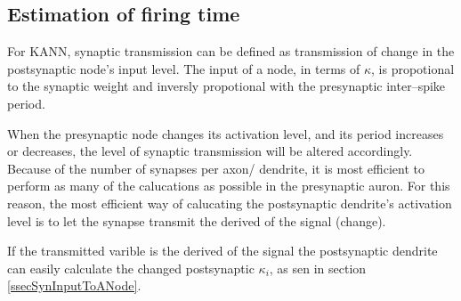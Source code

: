 




	\subsection{Estimation of firing time}
	For KANN, synaptic transmission can be defined as transmission of change in the postsynaptic node's input level.
	The input of a node, in terms of $\kappa$, is propotional to the synaptic weight and inversly propotional with the presynaptic inter--spike period.

	When the presynaptic node changes its activation level, and its period increases or decreases, the level of synaptic transmission will be altered accordingly. 
	Because of the number of synapses per axon/ dendrite, it is most efficient to perform as many of the calucations as possible in the presynaptic auron.
	For this reason, the most efficient way of calucating the postsynaptic dendrite's activation level is to let the synapse transmit the derived of the signal (change).

	If the transmitted varible is the derived of the signal the postsynaptic dendrite can easily calculate the changed postsynaptic $\kappa_i$, as sen in section \ref{ssecSynInputToANode}.
	
